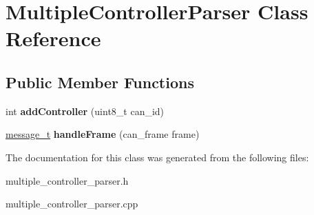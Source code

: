\hypertarget{classMultipleControllerParser}{}\section{Multiple\+Controller\+Parser Class Reference}
\label{classMultipleControllerParser}
\subsection*{Public Member Functions}
\begin{DoxyCompactItemize}
\item 
\mbox{\label{classMultipleControllerParser_a9f7fc9bcef88ff36f78add7ee5e22fd3}} 
int {\bfseries add\+Controller} (uint8\+\_\+t can\+\_\+id)
\item 
\mbox{\label{classMultipleControllerParser_a8bef539882907a651c6ad1938da9f0e7}} 
\hyperlink{structMessage}{message\+\_\+t} {\bfseries handle\+Frame} (can\+\_\+frame frame)
\end{DoxyCompactItemize}


The documentation for this class was generated from the following files\+:\begin{DoxyCompactItemize}
\item 
multiple\+\_\+controller\+\_\+parser.\+h\item 
multiple\+\_\+controller\+\_\+parser.\+cpp\end{DoxyCompactItemize}

